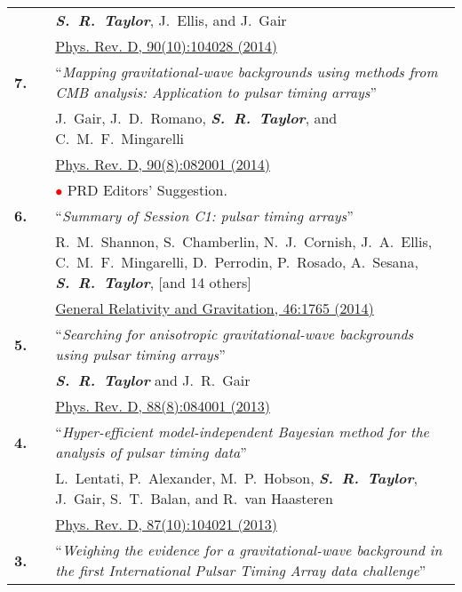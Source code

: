 \documentclass[11pt,letterpaper,sans]{moderncv}
\begin{document}
{\begin{longtable}{rp{0.3cm}p{15.8cm}}
&& \textit{\textbf{S.~R.~Taylor}}, J.~Ellis, and J.~Gair \\ 
&& \href{http://journals.aps.org/prd/abstract/10.1103/PhysRevD.90.104028}{{\color{color1} Phys. Rev. D, 90(10):104028 (2014)}} \vspace{0.09cm}\\
\textbf{7.} & & ``\textit{Mapping gravitational-wave backgrounds using methods from CMB analysis: Application to pulsar timing arrays}'' \\ 
&& J.~Gair, J.~D.~Romano, \textit{\textbf{S.~R.~Taylor}}, and C.~M.~F.~Mingarelli \\ 
&& \href{http://journals.aps.org/prd/abstract/10.1103/PhysRevD.90.082001}{{\color{color1} Phys. Rev. D, 90(8):082001 (2014)}} \\
&& \textcolor{red}{$\bullet$} PRD Editors' Suggestion.\vspace{0.09cm}\\
\textbf{6.} & & ``\textit{Summary of Session C1: pulsar timing arrays}'' \\ 
&& R.~M.~Shannon, S.~Chamberlin, N.~J.~Cornish, J.~A.~Ellis, C.~M.~F.~Mingarelli, D.~Perrodin, P.~Rosado, A.~Sesana, \textit{\textbf{S.~R.~Taylor}}, [and 14 others] \\ 
&& \href{http://link.springer.com/article/10.1007\%2Fs10714-014-1765-4}{{\color{color1} General Relativity and Gravitation, 46:1765 (2014)}} \vspace{0.09cm}\\
\textbf{5.} & & ``\textit{Searching for anisotropic gravitational-wave backgrounds using pulsar timing arrays}'' \\ 
&& \textit{\textbf{S.~R.~Taylor}} and J.~R.~Gair \\ 
&& \href{http://journals.aps.org/prd/abstract/10.1103/PhysRevD.88.084001}{{\color{color1} Phys. Rev. D, 88(8):084001 (2013)}} \vspace{0.09cm}\\
\textbf{4.} & & ``\textit{Hyper-efficient model-independent Bayesian method for the analysis of pulsar timing data}'' \\ 
&& L.~Lentati, P.~Alexander, M.~P.~Hobson, \textit{\textbf{S.~R.~Taylor}}, J.~Gair, S.~T.~Balan, and R.~van Haasteren \\ 
&& \href{http://journals.aps.org/prd/abstract/10.1103/PhysRevD.87.104021}{{\color{color1} Phys. Rev. D, 87(10):104021 (2013)}} \vspace{0.09cm}\\
\textbf{3.} & & ``\textit{Weighing the evidence for a gravitational-wave background in the first International Pulsar Timing Array data challenge}'' \\ 

\end{longtable}}
\end{document}
